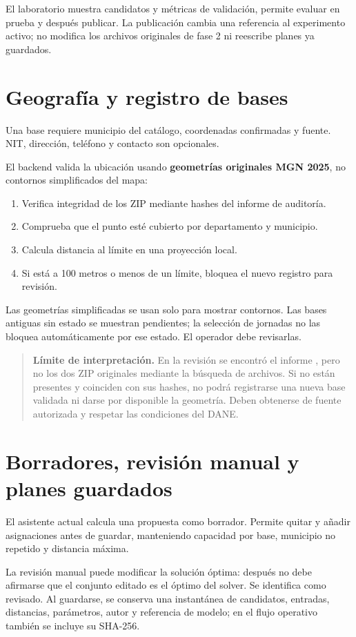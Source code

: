 \documentclass[11pt,a4paper]{report}
\newcommand{\campo}[1]{\texttt{\detokenize{#1}}}
\newcommand{\advertencia}[1]{\begin{quote}\textbf{Límite de interpretación.} #1\end{quote}}
\begin{document}
El laboratorio muestra candidatos y métricas de validación, permite evaluar en prueba y después publicar. La publicación cambia una referencia al experimento activo; no modifica los archivos originales de fase 2 ni reescribe planes ya guardados.

\section{Geografía y registro de bases}
Una base requiere municipio del catálogo, coordenadas confirmadas y fuente. NIT, dirección, teléfono y contacto son opcionales.

El backend valida la ubicación usando \textbf{geometrías originales MGN 2025}, no contornos simplificados del mapa:
\begin{enumerate}
\item Verifica integridad de los ZIP mediante hashes del informe de auditoría.
\item Comprueba que el punto esté cubierto por departamento y municipio.
\item Calcula distancia al límite en una proyección local.
\item Si está a 100 metros o menos de un límite, bloquea el nuevo registro para revisión.
\end{enumerate}
Las geometrías simplificadas se usan solo para mostrar contornos. Las bases antiguas sin estado se muestran pendientes; la selección de jornadas no las bloquea automáticamente por ese estado. El operador debe revisarlas.

\advertencia{En la revisión se encontró el informe \campo{audit.json}, pero no los dos ZIP originales mediante la búsqueda de archivos. Si no están presentes y coinciden con sus hashes, no podrá registrarse una nueva base validada ni darse por disponible la geometría. Deben obtenerse de fuente autorizada y respetar las condiciones del DANE.}

\section{Borradores, revisión manual y planes guardados}
El asistente actual calcula una propuesta como borrador. Permite quitar y añadir asignaciones antes de guardar, manteniendo capacidad por base, municipio no repetido y distancia máxima.

La revisión manual puede modificar la solución óptima: después no debe afirmarse que el conjunto editado es el óptimo del solver. Se identifica como revisado. Al guardarse, se conserva una instantánea de candidatos, entradas, distancias, parámetros, autor y referencia de modelo; en el flujo operativo también se incluye su SHA-256.
\end{document}
